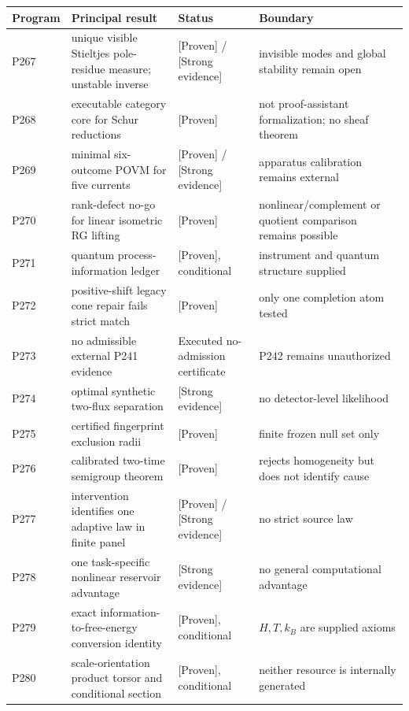 \documentclass[11pt,a4paper,openany]{report}
\newcommand{\statusProven}{\textcolor{fingreen}{[Proven]}}
\newcommand{\statusStrong}{\textcolor{finblue}{[Strong evidence]}}
\begin{document}
\begin{center}
\begingroup\small
\setlength{\tabcolsep}{2.5pt}
\renewcommand{\arraystretch}{1.16}
\begin{longtable}{@{}p{}p{}p{}p{}@{}}
\toprule
\textbf{Program} & \textbf{Principal result} & \textbf{Status} & \textbf{Boundary} \\
\midrule
\endhead
P267 & unique visible Stieltjes pole-residue measure; unstable inverse & \statusProven{} /\allowbreak{} \statusStrong{} & invisible modes and global stability remain open \\
P268 & executable category core for Schur reductions & \statusProven{} & not proof-assistant formalization; no sheaf theorem \\
P269 & minimal six-outcome POVM for five currents & \statusProven{} /\allowbreak{} \statusStrong{} & apparatus calibration remains external \\
P270 & rank-defect no-go for linear isometric RG lifting & \statusProven{} & nonlinear/\allowbreak{}complement or quotient comparison remains possible \\
P271 & quantum process-information ledger & \statusProven{}, conditional & instrument and quantum structure supplied \\
P272 & positive-shift legacy cone repair fails strict match & \statusProven{} & only one completion atom tested \\
P273 & no admissible external P241 evidence & Executed no-admission certificate & P242 remains unauthorized \\
P274 & optimal synthetic two-flux separation & \statusStrong{} & no detector-level likelihood \\
P275 & certified fingerprint exclusion radii & \statusProven{} & finite frozen null set only \\
P276 & calibrated two-time semigroup theorem & \statusProven{} & rejects homogeneity but does not identify cause \\
P277 & intervention identifies one adaptive law in finite panel & \statusProven{} /\allowbreak{} \statusStrong{} & no strict source law \\
P278 & one task-specific nonlinear reservoir advantage & \statusStrong{} & no general computational advantage \\
P279 & exact information-to-free-energy conversion identity & \statusProven{}, conditional & \(H,T,k_B\) are supplied axioms \\
P280 & scale-orientation product torsor and conditional section & \statusProven{}, conditional & neither resource is internally generated \\
\bottomrule
\end{longtable}
\endgroup
\end{center}
\end{document}
